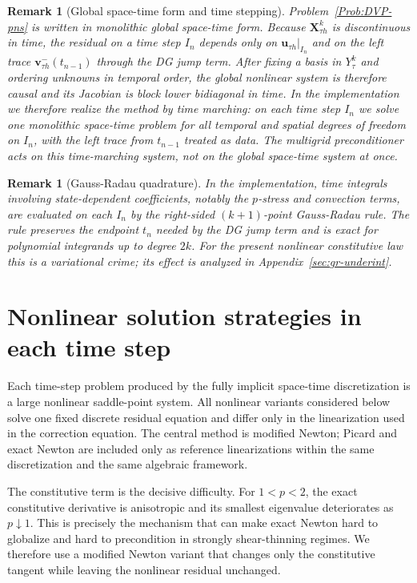 \documentclass[DIV=16]{scrartcl}
\newtheorem{remark}[theorem]{Remark}
\newcommand{\uu}{\boldsymbol v}
\newcommand{\In}{I_n}
\newcommand{\pn}{p}
\begin{document}
\begin{remark}[Global space-time form and time stepping]
\label{rem:time-step-wise}
Problem~\ref{Prob:DVP-pns} is written in monolithic global space-time form.
Because $\boldsymbol X_{\tau h}^k$ is discontinuous in time, the residual on a
time step $\In$ depends only on $\boldsymbol u_{\tau h}|_{\In}$ and on the left
trace $\uu_{\tau h}^-(t_{n-1})$ through the DG jump term. After fixing a basis
in $Y_\tau^k$ and ordering unknowns in temporal order, the global nonlinear
system is therefore causal and its Jacobian is block lower bidiagonal in time.
In the implementation we therefore realize the method by time marching: on each
time step $\In$ we solve one monolithic space-time problem for all temporal and
spatial degrees of freedom on $\In$, with the left trace from $t_{n-1}$ treated
as data. The multigrid preconditioner acts on this time-marching system, not on
the global space-time system at once.
\end{remark}

\begin{remark}[Gauss-Radau quadrature]\label{rem:gauss-radau}
In the implementation, time integrals involving state-dependent coefficients,
notably the $\pn$-stress and convection terms, are evaluated on each $\In$ by
the right-sided $(k{+}1)$-point Gauss-Radau rule.
The rule preserves the endpoint $t_n$ needed by the DG jump term and is exact
for polynomial integrands up to degree $2k$.
For the present nonlinear constitutive law this is a variational crime; its
effect is analyzed in Appendix~\ref{sec:gr-underint}.
\end{remark}

\section{Nonlinear solution strategies in each time step}
\label{sec:newton}

Each time-step problem produced by the fully implicit space-time discretization
is a large nonlinear saddle-point system. All nonlinear variants considered
below solve one fixed discrete residual equation and differ only in the
linearization used in the correction equation. The central method is modified
Newton; Picard and exact Newton are included only as reference linearizations
within the same discretization and the same algebraic framework.

The constitutive term is the decisive difficulty.
For $1<\pn < 2$, the exact constitutive derivative is anisotropic and its
smallest eigenvalue deteriorates as $\pn\downarrow 1$.
This is precisely the mechanism that can make exact Newton hard to globalize and
hard to precondition in strongly shear-thinning regimes.
We therefore use a modified Newton variant that changes only the constitutive
tangent while leaving the nonlinear residual unchanged.
\end{document}
